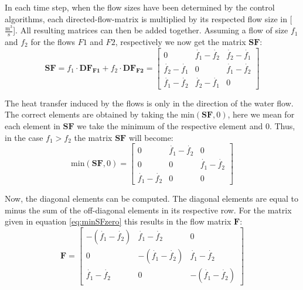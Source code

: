 In each time step, when the flow sizes have been determined by the control algorithms, each directed-flow-matrix is multiplied by its respected flow size in [$\frac{\text{m}^3}{\text{s}}$]. All resulting matrices can then be added together. Assuming a flow of size $f_1$ and $f_2$ for the flows $F1$ and $F2$, respectively we now get the matrix $\mathbf{SF}$:
\begin{equation}
	\mathbf{SF} = f_1 \cdot \mathbf{DF_{F1}} + f_2 \cdot \mathbf{DF_{F2}} = 
	\begin{bmatrix}
		0     & \dot{f_1}-\dot{f_2} & \dot{f_2}-\dot{f_1} \\
		\dot{ f_2}-\dot{f_1}  & 0       & \dot{f_1}-\dot{f_2} \\
		\dot{f_1}-\dot{f_2}  & \dot{f_2}-\dot{f_1} & 0       
	\end{bmatrix}
	\label{eq:addbufferflows}
\end{equation}

The heat transfer induced by the flows is only in the direction of the water flow. The correct elements are obtained by taking the $\text{min}(\mathbf{SF},0)$, here we mean for each element in $\mathbf{SF}$ we take the minimum of the respective element and 0. Thus, in the case $f_1>f_2$ the matrix $\mathbf{SF}$ will become:
\begin{equation}
	\text{min}(\mathbf{SF},0) =  \begin{bmatrix}
		0     & \dot{f_1}-\dot{f_2} & 0 \\
		0     & 0       & \dot{f_1}-\dot{f_2} \\
		\dot{f_1}-\dot{f_2}  & 0       & 0     
	\end{bmatrix}
	\label{eq:minSFzero}
\end{equation}

Now, the diagonal elements can be computed. The diagonal elements are equal to minus the sum of the off-diagonal elements in its respective row. For the matrix given in equation \ref{eq:minSFzero} this results in the flow matrix $\mathbf{F}$:
\begin{equation}
	\mathbf{F} =  \begin{bmatrix}
		-(\dot{f_1}-\dot{f_2})   & \dot{f_1}-\dot{f_2} & 0 \\
		0     & -(\dot{f_1}-\dot{f_2})       & \dot{f_1}-\dot{f_2} \\
		\dot{f_1}-\dot{f_2}  & 0       & -(\dot{f_1}-\dot{f_2})     
	\end{bmatrix}
	\label{eq:flowmatrix}
\end{equation}

